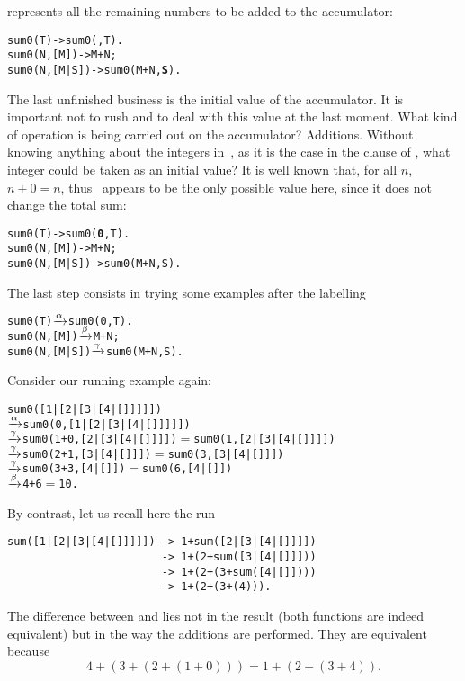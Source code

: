 represents all the remaining numbers to be added to the accumulator:
\begin{alltt}
sum0(T)       -> sum0(,T).
sum0(N,[M])   -> M+N;
sum0(N,[M|S]) -> sum0(M+N,\textbf{S}).
\end{alltt}
The last unfinished business is the initial value of the
accumulator. It is important not to rush and to deal with this value
at the last moment. What kind of operation is being carried out on the
accumulator? Additions. Without knowing anything about the integers
in~, as it is the case in the clause of ,
what integer could be taken as an initial value? It is well known
that, for all \(n\), \(n + 0 = n\), thus ~appears to be the
only possible value here, since it does not change the total sum:
\begin{alltt}
sum0(T)       -> sum0(\textbf{0},T).
sum0(N,[M])   -> M+N;
sum0(N,[M|S]) -> sum0(M+N,S).
\end{alltt}
The last step consists in trying some examples after the labelling
\begin{alltt}
sum0(T)       \(\xrightarrow{\smash[t]{\alpha}}\) sum0(0,T).
sum0(N,[M])   \(\xrightarrow{\smash[t]{\beta}}\) M+N;
sum0(N,[M|S]) \(\xrightarrow{\smash[t]{\gamma}}\) sum0(M+N,S).
\end{alltt}
Consider our running example again:
\begin{alltt}
sum0([1|[2|[3|[4|[]]]]])
  \(\xrightarrow{\smash[t]{\alpha}}\) sum0(0,[1|[2|[3|[4|[]]]]])
  \(\xrightarrow{\smash[t]{\gamma}}\) sum0(1+0,[2|[3|[4|[]]]])   \(=\) sum0(1,[2|[3|[4|[]]]])
  \(\xrightarrow{\smash[t]{\gamma}}\) sum0(2+1,[3|[4|[]]])       \(=\) sum0(3,[3|[4|[]]])
  \(\xrightarrow{\smash[t]{\gamma}}\) sum0(3+3,[4|[]])           \(=\) sum0(6,[4|[]])
  \(\xrightarrow{\smash[t]{\beta}}\) 4 + 6                      \(=\) 10\textrm{.}
\end{alltt}
By contrast, let us recall here the run
\begin{verbatim}
sum([1|[2|[3|[4|[]]]]]) -> 1+sum([2|[3|[4|[]]]])
                        -> 1+(2+sum([3|[4|[]]]))
                        -> 1+(2+(3+sum([4|[]])))
                        -> 1+(2+(3+(4))).
\end{verbatim}
The difference between  and  lies
not in the result (both functions are indeed equivalent) but in the
way the additions are performed. They are equivalent because
\begin{equation*}
4 + (3 + (2 + (1 + 0))) = 1 + (2 + (3 + 4)).
\end{equation*}
